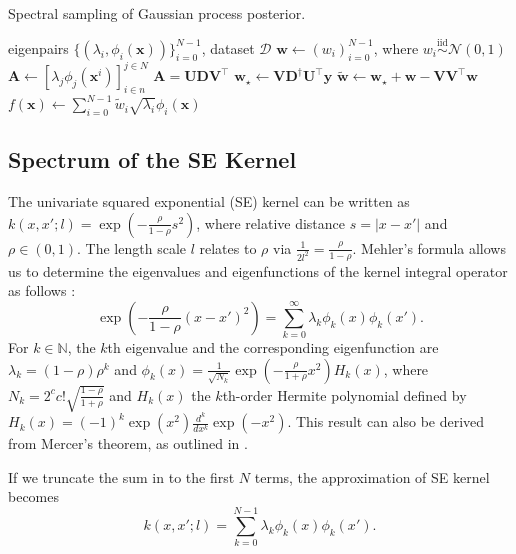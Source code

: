 \documentclass{article}
\begin{document}
\begin{algorithm}[h]
  \caption{Spectral sampling of Gaussian process posterior.}
  \label{alg:sam_postGP}
  \begin{algorithmic}[1] %
    \Input eigenpairs $\{(\lambda_i, \phi_i(\mathbf{x}))\}_{i=0}^{N-1}$,
  dataset $\mathcal{D}$
    \State $\mathbf{w} \gets (w_i)_{i=0}^{N-1}$, where
  $w_i \overset{\text{iid}}{\sim} \mathcal{N}(0,1)$
    \State $\mathbf{A} \gets [\lambda_j \phi_j(\mathbf{x}^i)]_{i \in n}^{j \in N}$
    \State $\mathbf{A} = \mathbf{U} \mathbf{D} \mathbf{V}^\intercal$ 
    \State $\mathbf{w}_\star \gets \mathbf{V} \mathbf{D}^\dagger \mathbf{U}^\intercal \mathbf{y}$
    \State $\widetilde{\mathbf{w}} \gets \mathbf{w}_\star + \mathbf{w} - \mathbf{V} \mathbf{V}^\intercal \mathbf{w}$
    \State \Return $f(\mathbf{x}) \gets \sum_{i=0}^{N-1} \widetilde{w}_i \sqrt{\lambda_i} \phi_i(\mathbf{x})$
  \end{algorithmic}
\end{algorithm}

\subsection{Spectrum of the SE Kernel}

The univariate squared exponential (SE) kernel can be written as
$k(x, x'; l) = \exp(-\frac{\rho}{1-\rho} s^2)$, where relative distance $s = |x - x'|$ and $\rho \in (0,1)$.
The length scale $l$ relates to $\rho$ via $\frac{1}{2 l^2} = \frac{\rho}{1-\rho}$.
Mehler's formula allows us to determine the eigenvalues and eigenfunctions of the kernel integral operator as follows \cite{Vinaroz2022}:
\begin{equation}\label{eqn621}
	\exp(-\frac{\rho}{1-\rho} (x - x')^2) = \sum_{k=0}^{\infty} \lambda_k \phi_k(x) \phi_k(x').
\end{equation} 
For $k \in \mathbb{N}$, the $k$th eigenvalue and the corresponding eigenfunction are $\lambda_k = (1-\rho) \rho^k$ and
$\phi_k(x) = \frac{1}{\sqrt{N_k}} \exp\left(-\frac{\rho}{1+\rho} x^2\right) H_k(x)$, where $N_k = 2^c c! \sqrt{\frac{1-\rho}{1+\rho}}$ and $H_k(x)$ the $k$th-order Hermite polynomial defined by
$H_k(x) = (-1)^k \exp(x^2) \frac{d^k}{dx^k} \exp(-x^2)$.
This result can also be derived from Mercer's theorem, as outlined in \cite{ZhuHY1998}.

If we truncate the sum in  to the first $N$ terms, the approximation of SE kernel becomes
\begin{equation}\label{eqn622}
	k(x, x'; l) = \sum_{k=0}^{N-1} \lambda_k \phi_k(x) \phi_k(x').
\end{equation}
\end{document}
